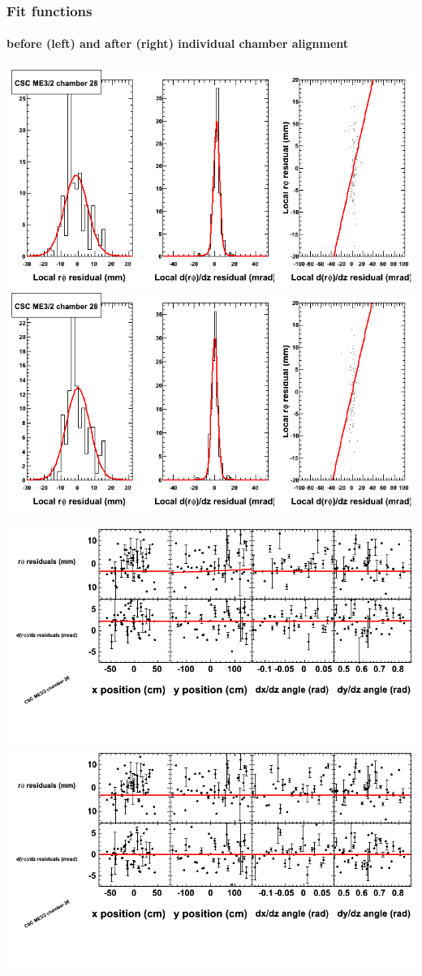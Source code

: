 \documentclass[compress]{beamer}
\begin{document}
\begin{frame}
\frametitle{Fit functions}
\framesubtitle{before (left) and after (right) individual chamber alignment}
\includegraphics[width=0.5\linewidth]{ringfits_3dof/beforefit_MEp32_28_bellcurve.png} \includegraphics[width=0.5\linewidth]{ringfits_3dof/afterfit_MEp32_28_bellcurve.png}

\includegraphics[width=0.5\linewidth]{ringfits_3dof/beforefit_MEp32_28_polynomials.png} \includegraphics[width=0.5\linewidth]{ringfits_3dof/afterfit_MEp32_28_polynomials.png}
\end{frame}
\end{document}
